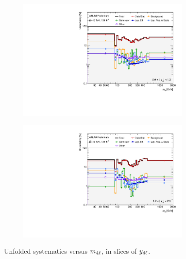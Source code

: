 \begin{figure}[hp]
    \begin{subfigure}{.49\textwidth}\centering\includegraphics[width = 0.95\textwidth]{Figures/m4l/Systematics/Unfolded/UnfoldedSys_M4lvRapiditybin_Stack_Paper3.pdf}\end{subfigure}
    \begin{subfigure}{.49\textwidth}\centering\includegraphics[width = 0.95\textwidth]{Figures/m4l/Systematics/Unfolded/UnfoldedSys_M4lvRapiditybin_Stack_Paper4.pdf}\end{subfigure}
    \caption{Unfolded systematics versus $m_{4\ell}$, in slices of $y_{4\ell}$.}
\end{figure}

